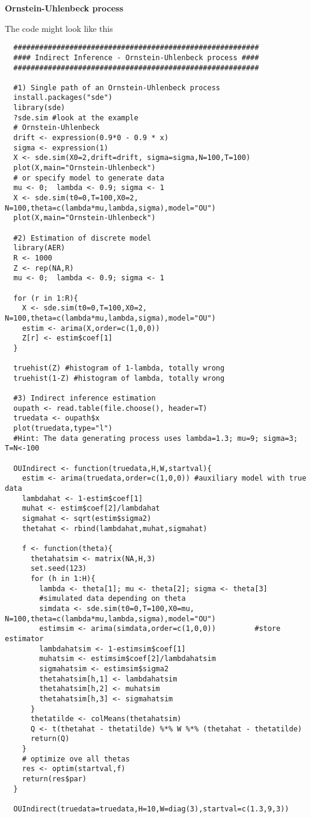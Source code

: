 \documentclass{article}
\begin{document}
\begin{solution}
\textbf{Ornstein-Uhlenbeck process}

The code might look like this
\begin{verbatim}
  #########################################################
  #### Indirect Inference - Ornstein-Uhlenbeck process ####
  #########################################################

  #1) Single path of an Ornstein-Uhlenbeck process
  install.packages("sde")
  library(sde)
  ?sde.sim #look at the example
  # Ornstein-Uhlenbeck
  drift <- expression(0.9*0 - 0.9 * x)
  sigma <- expression(1)
  X <- sde.sim(X0=2,drift=drift, sigma=sigma,N=100,T=100)
  plot(X,main="Ornstein-Uhlenbeck")
  # or specify model to generate data
  mu <- 0;  lambda <- 0.9; sigma <- 1
  X <- sde.sim(t0=0,T=100,X0=2, N=100,theta=c(lambda*mu,lambda,sigma),model="OU")
  plot(X,main="Ornstein-Uhlenbeck")

  #2) Estimation of discrete model
  library(AER)
  R <- 1000
  Z <- rep(NA,R)
  mu <- 0;  lambda <- 0.9; sigma <- 1

  for (r in 1:R){
    X <- sde.sim(t0=0,T=100,X0=2, N=100,theta=c(lambda*mu,lambda,sigma),model="OU")
    estim <- arima(X,order=c(1,0,0))
    Z[r] <- estim$coef[1]
  }

  truehist(Z) #histogram of 1-lambda, totally wrong
  truehist(1-Z) #histogram of lambda, totally wrong

  #3) Indirect inference estimation
  oupath <- read.table(file.choose(), header=T)
  truedata <- oupath$x
  plot(truedata,type="l")
  #Hint: The data generating process uses lambda=1.3; mu=9; sigma=3; T=N<-100

  OUIndirect <- function(truedata,H,W,startval){
    estim <- arima(truedata,order=c(1,0,0)) #auxiliary model with true data
    lambdahat <- 1-estim$coef[1]
    muhat <- estim$coef[2]/lambdahat
    sigmahat <- sqrt(estim$sigma2)
    thetahat <- rbind(lambdahat,muhat,sigmahat)

    f <- function(theta){
      thetahatsim <- matrix(NA,H,3)
      set.seed(123)
      for (h in 1:H){
        lambda <- theta[1]; mu <- theta[2]; sigma <- theta[3]
        #simulated data depending on theta
        simdata <- sde.sim(t0=0,T=100,X0=mu, N=100,theta=c(lambda*mu,lambda,sigma),model="OU")
        estimsim <- arima(simdata,order=c(1,0,0))         #store estimator
        lambdahatsim <- 1-estimsim$coef[1]
        muhatsim <- estimsim$coef[2]/lambdahatsim
        sigmahatsim <- estimsim$sigma2
        thetahatsim[h,1] <- lambdahatsim
        thetahatsim[h,2] <- muhatsim
        thetahatsim[h,3] <- sigmahatsim
      }
      thetatilde <- colMeans(thetahatsim)
      Q <- t(thetahat - thetatilde) %*% W %*% (thetahat - thetatilde)
      return(Q)
    }
    # optimize ove all thetas
    res <- optim(startval,f)
    return(res$par)
  }

  OUIndirect(truedata=truedata,H=10,W=diag(3),startval=c(1.3,9,3))
\end{verbatim}
\end{solution}
\end{document}

